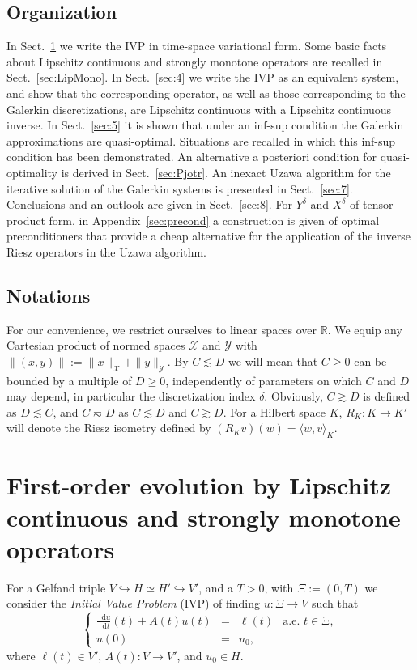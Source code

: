\documentclass{amsart}
\numberwithin{equation}{section}
\newcommand{\R}{\mathbb R}
\newcommand{\1}{\mathbb 1}
\newcommand*\diff{\mathop{}\!\mathrm{d}}
\newcommand{\be}{\begin{equation}}
\newcommand{\ee}{\end{equation}}
\begin{document}
\subsection{Organization} In Sect.~\ref{sec:2} we write the IVP in time-space variational form.
Some basic facts about Lipschitz continuous and strongly monotone operators are recalled in Sect.~\ref{sec:LipMono}.
In Sect.~\ref{sec:4} we write the IVP as an equivalent system, and show that the corresponding operator, as well as those corresponding to the Galerkin discretizations, are Lipschitz continuous with a Lipschitz continuous inverse. In Sect.~\ref{sec:5} it is shown that under an inf-sup condition the Galerkin approximations are quasi-optimal. Situations are recalled in which this inf-sup condition has been demonstrated. An alternative a posteriori condition for quasi-optimality is derived in Sect.~\ref{sec:Pjotr}. An inexact Uzawa algorithm for the iterative solution of the Galerkin systems is presented in Sect.~\ref{sec:7}. Conclusions and an outlook are given in Sect.~\ref{sec:8}.
For $Y^\delta$ and $X^\delta$ of tensor product form, in Appendix~\ref{sec:precond} a construction is given of optimal preconditioners that provide a cheap alternative for the application of the inverse Riesz operators in the Uzawa algorithm.

 
\subsection{Notations} For our convenience, we restrict ourselves to linear spaces over $\R$.
We equip any Cartesian product of normed spaces ${\mathcal X}$ and ${\mathcal Y}$ with $\|(x,y)\|:=\|x\|_{\mathcal X}+\|y\|_{\mathcal Y}$.
By $C \lesssim D$ we will mean that $C\ge0$ can be bounded by a multiple of $D\ge0$, independently of parameters on which $C$ and $ D$ may depend, in particular the discretization index $\delta$.
Obviously, $C \gtrsim D$ is defined as $D \lesssim C$, and $C\eqsim D$ as $C\lesssim D$ and $C \gtrsim D$.
For a Hilbert space $K$, $R_K\colon K \rightarrow K'$ will denote the Riesz isometry defined by $(R_K v)(w)=\langle w,v\rangle_K$.

\section{First-order evolution by Lipschitz continuous and strongly monotone operators} \label{sec:2}

For a Gelfand triple $V \hookrightarrow H \simeq H' \hookrightarrow V'$, and a $T>0$, with $\Xi:=(0,T)$ we consider the \emph{Initial Value Problem} (IVP) of finding $u\colon \Xi \rightarrow V$ such that
\be \label{eq:IVP}
\left\{
\begin{array}{rcll}
\tfrac{\diff u}{\diff t} (t)+A(t)u(t) & = & \ell(t) & \text{a.e. }t \in \Xi  , \\
u(0) & = & u_0,
\end{array}
\right.
\ee
where $\ell(t) \in V'$, $A(t)\colon V \rightarrow V'$, and $u_0 \in H$.
\end{document}
